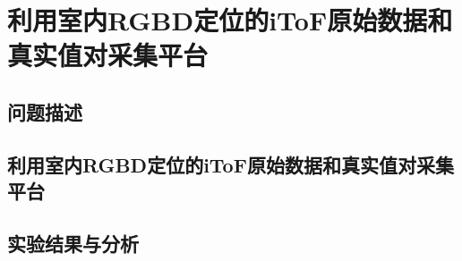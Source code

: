 \chapter{利用室内RGBD定位的iToF原始数据和真实值对采集平台}
\section{问题描述}
\section{利用室内RGBD定位的iToF原始数据和真实值对采集平台}
\section{实验结果与分析}